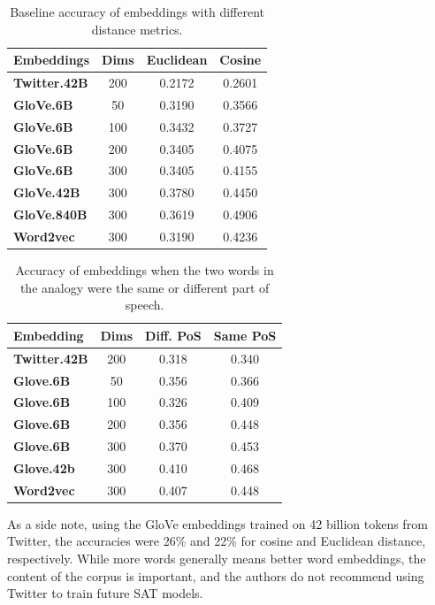 \documentclass[11pt]{article}
\begin{document}
\begin{table}[h]
\begin{center}
\begin{tabular}{|l|ccc|}
\hline \bf Embeddings & \bf Dims & \bf Euclidean & \bf Cosine \\ \hline
	\bf Twitter.42B & 200 & 0.2172 & 0.2601 \\
	\bf GloVe.6B & 50 & 0.3190 & 0.3566 \\
	\bf GloVe.6B & 100 & 0.3432 & 0.3727 \\
	\bf GloVe.6B & 200 & 0.3405 & 0.4075 \\
	\bf GloVe.6B & 300 & 0.3405 & 0.4155 \\
	\bf GloVe.42B & 300 & 0.3780 & 0.4450 \\
	\bf GloVe.840B & 300 & 0.3619 & 0.4906 \\
	\bf Word2vec & 300 & 0.3190 & 0.4236 \\\hline
\end{tabular}
\end{center}
\caption{\label{font-table} Baseline accuracy of embeddings with different distance metrics.}
\end{table}

\begin{table}[h]
\begin{center}
\begin{tabular}{|l|ccc|}
\hline\bf Embedding & \bf Dims & \bf Diff. PoS & \bf Same PoS \\\hline
\bf Twitter.42B & 200 & 0.318 & 0.340 \\
\bf Glove.6B & 50 & 0.356 & 0.366 \\
\bf Glove.6B & 100 & 0.326 & 0.409 \\
\bf Glove.6B & 200 & 0.356 & 0.448 \\
\bf Glove.6B & 300 & 0.370 & 0.453 \\
\bf Glove.42b & 300 & 0.410 & 0.468 \\
\bf Word2vec & 300 & 0.407 & 0.448 \\\hline
\end{tabular}
\end{center}
\caption{\label{font-table} Accuracy of embeddings when the two words in the analogy were the same or different part of speech.}
\end{table}

As a side note, using the GloVe embeddings trained on 42 billion tokens from
Twitter, the accuracies were 26\% and 22\% for cosine and Euclidean distance,
respectively. While more words generally means better word embeddings, the
content of the corpus is important, and the authors do not recommend using
Twitter to train future SAT models.
\end{document}
